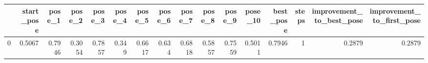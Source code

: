 \begin{tabular}{lrrrrrrrrrrrrrrr}
\toprule
{} &  start\_pose &  pose\_1 &  pose\_2 &  pose\_3 &  pose\_4 &  pose\_5 &  pose\_6 &  pose\_7 &  pose\_8 &  pose\_9 &  pose\_10 &  best\_pose &  steps &  improvement\_to\_best\_pose &  improvement\_to\_first\_pose \\
\midrule
0 &      0.5067 &  0.7946 &  0.3054 &  0.7857 &   0.349 &  0.6617 &   0.634 &  0.6818 &  0.5857 &  0.7559 &   0.5011 &     0.7946 &      1 &                    0.2879 &                     0.2879 \\
\bottomrule
\end{tabular}
